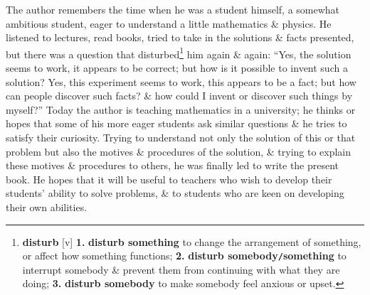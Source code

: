 \documentclass[oneside]{book}
\numberwithin{equation}{section}
\begin{document}
The author remembers the time when he was a student himself, a somewhat ambitious student, eager to understand a little mathematics \& physics. He listened to lectures, read books, tried to take in the solutions \& facts presented, but there was a question that disturbed\footnote{\textbf{disturb} [v] \textbf{1.} \textbf{disturb something} to change the arrangement of something, or affect how something functions; \textbf{2.} \textbf{disturb somebody\texttt{/}something} to interrupt somebody \& prevent them from continuing with what they are doing; \textbf{3.} \textbf{disturb somebody} to make somebody feel anxious or upset.} him again \& again: ``Yes, the solution seems to work, it appears to be correct; but how is it possible to invent such a solution? Yes, this experiment seems to work, this appears to be a fact; but how can people discover such facts? \& how could I invent or discover such things by myself?'' Today the author is teaching mathematics in a university; he thinks or hopes that some of his more eager students ask similar questions \& he tries to satisfy their curiosity. Trying to understand not only the solution of this or that problem but also the motives \& procedures of the solution, \& trying to explain these motives \& procedures to others, he was finally led to write the present book. He hopes that it will be useful to teachers who wish to develop their students' ability to solve problems, \& to students who are keen on developing their own abilities.
\end{document}
